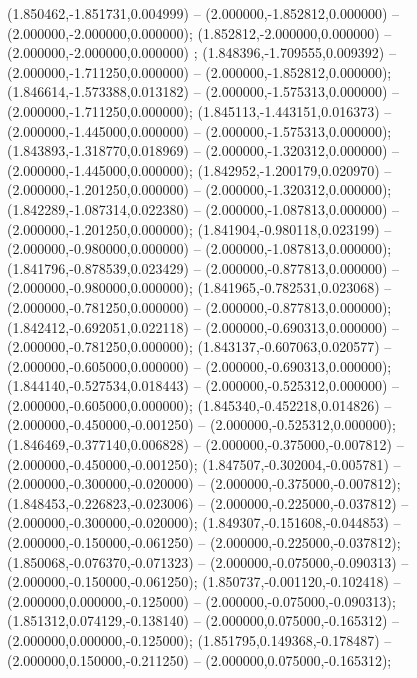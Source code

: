  (1.850462,-1.851731,0.004999) -- (2.000000,-1.852812,0.000000) -- (2.000000,-2.000000,0.000000);
 (1.852812,-2.000000,0.000000) -- (2.000000,-2.000000,0.000000) ;
 (1.848396,-1.709555,0.009392) -- (2.000000,-1.711250,0.000000) -- (2.000000,-1.852812,0.000000);
 (1.846614,-1.573388,0.013182) -- (2.000000,-1.575313,0.000000) -- (2.000000,-1.711250,0.000000);
 (1.845113,-1.443151,0.016373) -- (2.000000,-1.445000,0.000000) -- (2.000000,-1.575313,0.000000);
 (1.843893,-1.318770,0.018969) -- (2.000000,-1.320312,0.000000) -- (2.000000,-1.445000,0.000000);
 (1.842952,-1.200179,0.020970) -- (2.000000,-1.201250,0.000000) -- (2.000000,-1.320312,0.000000);
 (1.842289,-1.087314,0.022380) -- (2.000000,-1.087813,0.000000) -- (2.000000,-1.201250,0.000000);
 (1.841904,-0.980118,0.023199) -- (2.000000,-0.980000,0.000000) -- (2.000000,-1.087813,0.000000);
 (1.841796,-0.878539,0.023429) -- (2.000000,-0.877813,0.000000) -- (2.000000,-0.980000,0.000000);
 (1.841965,-0.782531,0.023068) -- (2.000000,-0.781250,0.000000) -- (2.000000,-0.877813,0.000000);
 (1.842412,-0.692051,0.022118) -- (2.000000,-0.690313,0.000000) -- (2.000000,-0.781250,0.000000);
 (1.843137,-0.607063,0.020577) -- (2.000000,-0.605000,0.000000) -- (2.000000,-0.690313,0.000000);
 (1.844140,-0.527534,0.018443) -- (2.000000,-0.525312,0.000000) -- (2.000000,-0.605000,0.000000);
 (1.845340,-0.452218,0.014826) -- (2.000000,-0.450000,-0.001250) -- (2.000000,-0.525312,0.000000);
 (1.846469,-0.377140,0.006828) -- (2.000000,-0.375000,-0.007812) -- (2.000000,-0.450000,-0.001250);
 (1.847507,-0.302004,-0.005781) -- (2.000000,-0.300000,-0.020000) -- (2.000000,-0.375000,-0.007812);
 (1.848453,-0.226823,-0.023006) -- (2.000000,-0.225000,-0.037812) -- (2.000000,-0.300000,-0.020000);
 (1.849307,-0.151608,-0.044853) -- (2.000000,-0.150000,-0.061250) -- (2.000000,-0.225000,-0.037812);
 (1.850068,-0.076370,-0.071323) -- (2.000000,-0.075000,-0.090313) -- (2.000000,-0.150000,-0.061250);
 (1.850737,-0.001120,-0.102418) -- (2.000000,0.000000,-0.125000) -- (2.000000,-0.075000,-0.090313);
 (1.851312,0.074129,-0.138140) -- (2.000000,0.075000,-0.165312) -- (2.000000,0.000000,-0.125000);
 (1.851795,0.149368,-0.178487) -- (2.000000,0.150000,-0.211250) -- (2.000000,0.075000,-0.165312);
